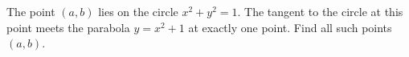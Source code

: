 The point $(a,b)$ lies on the circle $x^2+y^2=1$. The tangent to the circle at this point meets the parabola $y=x^2+1$ at exactly one point. Find all such points $(a,b)$.